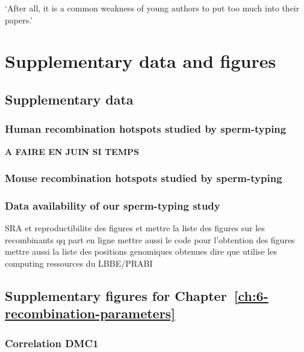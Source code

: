 \begin{savequote}[8cm]
‘After all, it is a common weakness of young authors to put too much into their papers.’

\end{savequote}

\chapter{\label{app:data-and-figs}Supplementary data and figures}

\minitoc{}

\section{Supplementary data}
\subsection{Human recombination hotspots studied by sperm-typing}
\textbf{A FAIRE EN JUIN SI TEMPS}
\subsection{Mouse recombination hotspots studied by sperm-typing}
\subsection{Data availability of our sperm-typing study}
SRA et reproductibilite des figures
et mettre la liste des figures sur les recombinants qq part en ligne
mettre aussi le code pour l'obtention des figures
mettre aussi la liste des positions genomiques obtenues
dire que utilise les computing ressources du LBBE/PRABI

\hypersetup{linkcolor=titlepagecolorsection}
\section{Supplementary figures for Chapter~\ref{ch:6-recombination-parameters}}
\hypersetup{linkcolor=black}

\subsection{Correlation DMC1}
